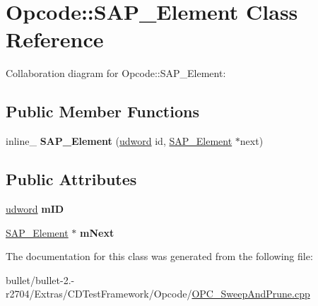 \hypertarget{class_opcode_1_1_s_a_p___element}{\section{Opcode\+:\+:S\+A\+P\+\_\+\+Element Class Reference}
\label{class_opcode_1_1_s_a_p___element}
}


Collaboration diagram for Opcode\+:\+:S\+A\+P\+\_\+\+Element\+:
\subsection*{Public Member Functions}
\begin{DoxyCompactItemize}
\item 
\hypertarget{class_opcode_1_1_s_a_p___element_a7c618b5ff8abc1df368e26685ac26303}{inline\+\_\+ {\bfseries S\+A\+P\+\_\+\+Element} (\hyperlink{_ice_types_8h_a44c6f1920ba5551225fb534f9d1a1733}{udword} id, \hyperlink{class_opcode_1_1_s_a_p___element}{S\+A\+P\+\_\+\+Element} $\ast$next)}\label{class_opcode_1_1_s_a_p___element_a7c618b5ff8abc1df368e26685ac26303}

\end{DoxyCompactItemize}
\subsection*{Public Attributes}
\begin{DoxyCompactItemize}
\item 
\hypertarget{class_opcode_1_1_s_a_p___element_ae70a0b860616d12fcd7df3de5b755f1e}{\hyperlink{_ice_types_8h_a44c6f1920ba5551225fb534f9d1a1733}{udword} {\bfseries m\+I\+D}}\label{class_opcode_1_1_s_a_p___element_ae70a0b860616d12fcd7df3de5b755f1e}

\item 
\hypertarget{class_opcode_1_1_s_a_p___element_aa8475c40c88bd7161cdf28c453f3cafe}{\hyperlink{class_opcode_1_1_s_a_p___element}{S\+A\+P\+\_\+\+Element} $\ast$ {\bfseries m\+Next}}\label{class_opcode_1_1_s_a_p___element_aa8475c40c88bd7161cdf28c453f3cafe}

\end{DoxyCompactItemize}


The documentation for this class was generated from the following file\+:\begin{DoxyCompactItemize}
\item 
bullet/bullet-\/2.-\/r2704/\+Extras/\+C\+D\+Test\+Framework/\+Opcode/\hyperlink{_o_p_c___sweep_and_prune_8cpp}{O\+P\+C\+\_\+\+Sweep\+And\+Prune.\+cpp}\end{DoxyCompactItemize}
